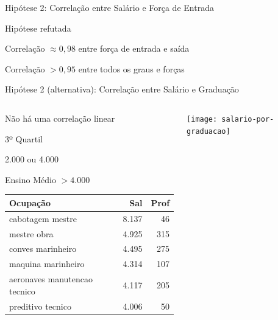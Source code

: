 \documentclass[10pt, hyperref={pdfpagelabels=false}]{beamer}
\begin{document}
\begin{frame}[c, label=hipotese-salario]{Hipótese 2: Correlação entre Salário e Força de Entrada}
  \begin{center}
    \Large
    Hipótese \alert{refutada}
    
    \large
    Correlação $\approx 0,98$ entre força de entrada e saída
    
    Correlação $> 0,95$ entre todos os graus e forças
  \end{center}
\end{frame}

{
\begin{frame}[c, label=hipotese-salario-graduacao]{Hipótese 2 (alternativa): Correlação entre Salário e Graduação}
  \begin{center}
    \begin{columns}[onlytextwidth]
      \begin{column}{0.5\textwidth}
        \centering
        Não há uma correlação linear
        
        \vspace{\baselineskip}
        
        3º Quartil
        
        2.000 ou 4.000
        
        \vspace{\baselineskip}
        
        Ensino Médio $> 4.000$
        
        \vspace{0.5\baselineskip}
        
        \tiny
        \begin{table}[!h]
          \begin{tabular}{l|r|r}
            \hline
            Ocupação & Sal & Prof\\
            \hline
            \alert{cabotagem mestre} & 8.137 & 46\\
            \hline
            mestre obra & 4.925 & 315\\
            \hline
            conves marinheiro & 4.495 & 275\\
            \hline
            maquina marinheiro & 4.314 & 107\\
            \hline
            aeronaves manutencao tecnico & 4.117 & 205\\
            \hline
            preditivo tecnico & 4.006 & 50\\
            \hline
          \end{tabular}
        \end{table}
      \end{column}
      
      \begin{column}{0.5\textwidth}
        \texttt{[image: salario-por-graduacao]}
      \end{column}
    \end{columns}
  \end{center}
\end{frame}
}
\end{document}
